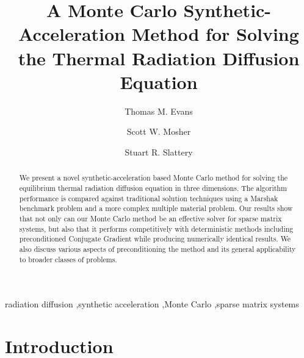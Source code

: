\documentclass[preprint,12pt]{elsarticle}
\begin{document}
\begin{frontmatter}

  \title{A Monte Carlo Synthetic-Acceleration Method for Solving the
    Thermal Radiation Diffusion Equation}

  \author[ornl]{Thomas M. Evans}
   

  \author[ornl]{Scott W. Mosher} 

  \author[wisc]{Stuart R. Slattery}
   

   

  \address[ornl]{Oak Ridge National Laboratory, 1 Bethel Valley Rd.,
    Oak Ridge, TN 37831 U.S.A.}  \address[wisc]{University of
    Wisconsin-Madison, 1500 Engineering Dr., Madison, WI 53716 U.S.A.}

  \begin{abstract}

    We present a novel synthetic-acceleration based Monte Carlo method
    for solving the equilibrium thermal radiation diffusion equation
    in three dimensions. The algorithm performance is compared against
    traditional solution techniques using a Marshak benchmark problem
    and a more complex multiple material problem. Our results show
    that not only can our Monte Carlo method be an effective solver
    for sparse matrix systems, but also that it performs competitively
    with deterministic methods including preconditioned Conjugate
    Gradient while producing numerically identical results. We also
    discuss various aspects of preconditioning the method and its
    general applicability to broader classes of problems.

  \end{abstract}

  \begin{keyword}
    radiation diffusion \sep synthetic acceleration \sep Monte Carlo
    \sep sparse matrix systems
  \end{keyword}

\end{frontmatter}

\section{Introduction}
\label{sec:introduction}
\end{document}
